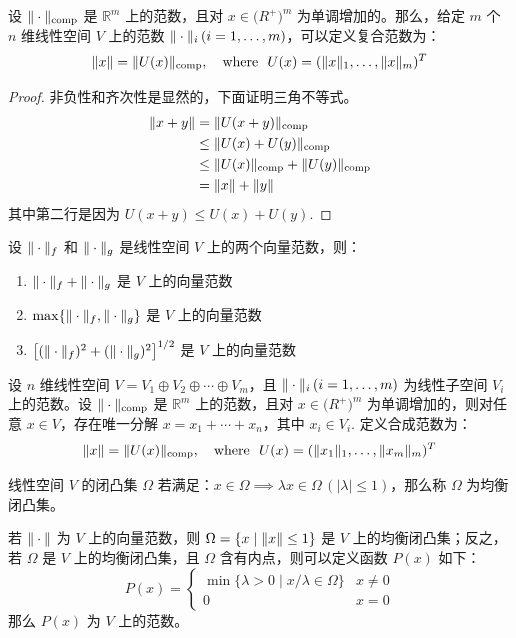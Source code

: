 \begin{theorem}[范数的复合]
设 $\Vert\cdot\Vert_\text{comp}$ 是 $\mathbb R^m$ 上的范数，且对 $x\in\mathbb (R^+)^m$ 为单调增加的。那么，给定 $m$ 个 $n$ 维线性空间 $V$ 上的范数 $\Vert\cdot\Vert_i\,(i=1,\ldots,m)$，可以定义复合范数为：
\[
    \Vert x\Vert=\Vert U(x)\Vert_\text{comp},\quad \text{where }\ U(x)=(\Vert x\Vert_1,\ldots,\Vert x\Vert_m)^T
\]
\end{theorem}
\begin{proof}
非负性和齐次性是显然的，下面证明三角不等式。
\begin{align*}
    \Vert x+y\Vert&=\Vert U(x+y)\Vert_\text{comp}\\
    &\leq\Vert U(x)+U(y)\Vert_\text{comp}\\
    &\leq\Vert U(x)\Vert_\text{comp}+\Vert U(y)\Vert_\text{comp}\\
    &=\Vert x\Vert+\Vert y\Vert
\end{align*}
其中第二行是因为 $U(x+y)\leq U(x)+U(y)$.
\end{proof}

\begin{example}
设 $\Vert\cdot\Vert_f$ 和 $\Vert\cdot\Vert_g$ 是线性空间 $V$ 上的两个向量范数，则：
\begin{enumerate}
    \item $\Vert\cdot\Vert_f+\Vert\cdot\Vert_g$ 是 $V$ 上的向量范数
    \item $\max\{\Vert\cdot\Vert_f,\Vert\cdot\Vert_g\}$ 是 $V$ 上的向量范数
    \item $\left[(\Vert\cdot\Vert_f)^2+(\Vert\cdot\Vert_g)^2\right]^{1/2}$ 是 $V$ 上的向量范数
\end{enumerate}
\end{example}

\begin{theorem}[范数的合成]
设 $n$ 维线性空间 $V=V_1\oplus V_2\oplus\cdots\oplus V_m$，且 $\Vert\cdot\Vert_i\,(i=1,\ldots,m)$ 为线性子空间 $V_i$ 上的范数。设 $\Vert\cdot\Vert_\text{comp}$ 是 $\mathbb R^m$ 上的范数，且对 $x\in\mathbb (R^+)^m$ 为单调增加的，则对任意 $x\in V$，存在唯一分解 $x=x_1+\cdots+x_n$，其中 $x_i\in V_i$.  定义合成范数为：  
\[
    \norm x=\norm{U(x)}_\text{comp},\quad\text{where }\ U(x)=(\norm{x_1}_1,\ldots,\norm{x_m}_m)^T
\]
\end{theorem}

\begin{definition}[均衡闭凸集]
线性空间 $V$ 的闭凸集 $\Omega$ 若满足：$x\in\Omega\implies \lambda x\in\Omega\,(|\lambda|\leq1)$，那么称 $\Omega$ 为均衡闭凸集。
\end{definition}

\begin{theorem}
若 $\Vert\cdot\Vert$ 为 $V$ 上的向量范数，则 $\Omega=\{x\mid\Vert x\Vert\leq 1\}$ 是 $V$ 上的均衡闭凸集；反之，若 $\Omega$ 是 $V$ 上的均衡闭凸集，且 $\Omega$ 含有内点，则可以定义函数 $P(x)$ 如下：
\[
    P(x)=\begin{cases}\min\{\lambda>0\mid x/\lambda\in\Omega\}&x\neq0\\0&x=0\end{cases}
\]
那么 $P(x)$ 为 $V$ 上的范数。
\end{theorem}

